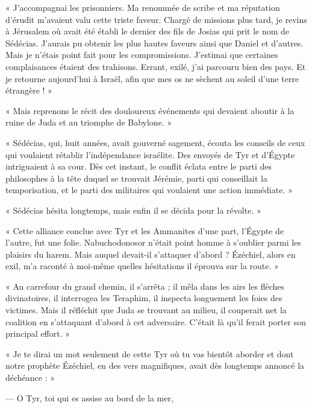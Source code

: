\documentclass[a4paper, 11pt, oneside, polutonikogreek, french]{article}
\begin{document}
« J'accompagnai les prisonniers. Ma renommée de scribe et ma réputation d'érudit m'avaient valu cette triste faveur. Chargé de missions plus tard, je revins à Jérusalem où avait été établi le dernier des fils de Josias qui prit le nom de Sédécias. J'aurais pu obtenir les plus hautes faveurs ainsi que Daniel et d'autres. Mais je n'étais point fait pour les compromissions. J'estimai que certaines complaisances étaient des trahisons. Errant, exilé, j'ai parcouru bien des pays. Et je retourne aujourd'hui à Israël, afin que mes os ne sèchent au soleil d'une terre étrangère ! »

\bigskip
\centerline{\EightStarTaper}
\centerline{\EightStarTaper\EightStarTaper}
\bigskip

« Mais reprenons le récit des douloureux événements qui devaient aboutir à la ruine de Juda et au triomphe de Babylone. »

« Sédécias, qui, huit années, avait gouverné sagement, écouta les conseils de ceux qui voulaient rétablir l'indépendance israélite. Des envoyés de Tyr et d'Égypte intriguaient à sa cour. Dès cet instant, le conflit éclata entre le parti des philosophes à la tête duquel se trouvait Jérémie, parti qui conseillait la temporisation, et le parti des militaires qui voulaient une action immédiate. »

« Sédécias hésita longtemps, mais enfin il se décida pour la révolte. »

« Cette alliance conclue avec Tyr et les Ammanites d'une part, l'Égypte de l'autre, fut une folie. Nabuchodonosor n'était point homme à s'oublier parmi les plaisirs du harem. Mais auquel devait-il s'attaquer d'abord ? Ézéchiel, alors en exil, m'a raconté à moi-même quelles hésitations il éprouva sur la route. »

« Au carrefour du grand chemin, il s'arrêta ; il mêla dans les airs les flèches divinatoires, il interrogea les Teraphim, il inspecta longuement les foies des victimes. Mais il réfléchit que Juda se trouvant au milieu, il couperait net la coalition en s'attaquant d'abord à cet adversaire. C'était là qu'il ferait porter son principal effort. »

« Je te dirai un mot seulement de cette Tyr où tu vas bientôt aborder et dont notre prophète Ézéchiel, en des vers magnifiques, avait dès longtemps annoncé la déchéance : »

\bigskip
\centerline{\EightStarTaper}
\centerline{\EightStarTaper\EightStarTaper}
\bigskip

--- O Tyr, toi qui es assise au bord de la mer,
\end{document}
